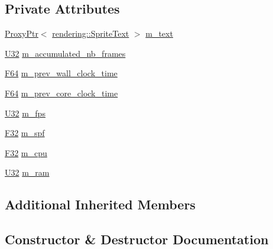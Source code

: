 \subsection*{Private Attributes}
\begin{DoxyCompactItemize}
\item 
\hyperlink{classmage_1_1_proxy_ptr}{Proxy\+Ptr}$<$ \hyperlink{classmage_1_1rendering_1_1_sprite_text}{rendering\+::\+Sprite\+Text} $>$ \hyperlink{classmage_1_1script_1_1_stats_script_a1fe11e7a3622fa5e3585fb6786e2d2e7}{m\+\_\+text}
\item 
\hyperlink{namespacemage_a41c104c036fba3756a74e19f793eeaa1}{U32} \hyperlink{classmage_1_1script_1_1_stats_script_a7ef910aceb585af53110697ea5b3f810}{m\+\_\+accumulated\+\_\+nb\+\_\+frames}
\item 
\hyperlink{namespacemage_ad26233bbec640deda836e572c1a23708}{F64} \hyperlink{classmage_1_1script_1_1_stats_script_a1f929fd926b90c7615e5ffc31bae8b93}{m\+\_\+prev\+\_\+wall\+\_\+clock\+\_\+time}
\item 
\hyperlink{namespacemage_ad26233bbec640deda836e572c1a23708}{F64} \hyperlink{classmage_1_1script_1_1_stats_script_a3bd65146319e43de291a11a123b8101e}{m\+\_\+prev\+\_\+core\+\_\+clock\+\_\+time}
\item 
\hyperlink{namespacemage_a41c104c036fba3756a74e19f793eeaa1}{U32} \hyperlink{classmage_1_1script_1_1_stats_script_adc14b9c342874824422d229c1f8573cc}{m\+\_\+fps}
\item 
\hyperlink{namespacemage_aa97e833b45f06d60a0a9c4fc22ae02c0}{F32} \hyperlink{classmage_1_1script_1_1_stats_script_a999da0fb2033212522a1c45a992dcd37}{m\+\_\+spf}
\item 
\hyperlink{namespacemage_aa97e833b45f06d60a0a9c4fc22ae02c0}{F32} \hyperlink{classmage_1_1script_1_1_stats_script_ad7af4d0fec97fd30637d6c1d393c8623}{m\+\_\+cpu}
\item 
\hyperlink{namespacemage_a41c104c036fba3756a74e19f793eeaa1}{U32} \hyperlink{classmage_1_1script_1_1_stats_script_a2a064095ffab6d72370808f383a16580}{m\+\_\+ram}
\end{DoxyCompactItemize}
\subsection*{Additional Inherited Members}


\subsection{Constructor \& Destructor Documentation}
\hypertarget{classmage_1_1script_1_1_stats_script_a6863940cb48633fbd5fc56547dc72a76}{}\label{classmage_1_1script_1_1_stats_script_a6863940cb48633fbd5fc56547dc72a76} 
